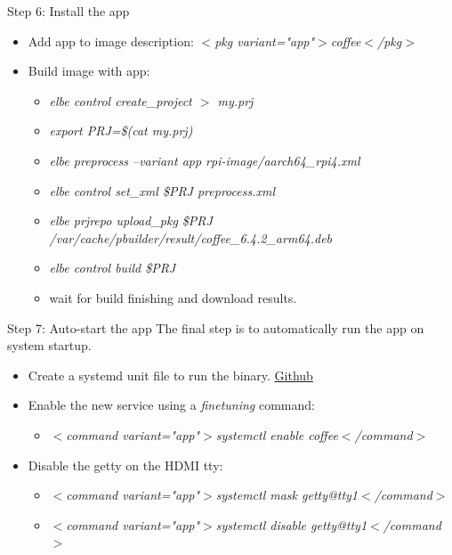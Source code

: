 \documentclass{beamer}
\begin{document}
\begin{frame}{Step 6: Install the app}
	\begin{itemize}
		\item Add app to image description: \emph{$<$pkg variant="app"$>$coffee$<$/pkg$>$}
		\item Build image with app:
		\small{\begin{itemize}
			\item \emph{elbe control create\_project $>$ my.prj}
			\item \emph{export PRJ=\$(cat my.prj)}
			\item \emph{elbe preprocess --variant app rpi-image/aarch64\_rpi4.xml}
			\item \emph{elbe control set\_xml \$PRJ preprocess.xml}
			\item \emph{elbe prjrepo upload\_pkg \$PRJ /var/cache/pbuilder/result/coffee\_6.4.2\_arm64.deb}
			\item \emph{elbe control build \$PRJ}
			\item wait for build finishing and download results.
		\end{itemize}}
	\end{itemize}
\end{frame}

\begin{frame}{Step 7: Auto-start the app}
	The final step is to automatically run the app on system startup.
	\begin{itemize}
		\item Create a systemd unit file to run the binary.
		\href{https://github.com/tomirgang/eh21_maintainable_linux/blob/main/examples/elbe_advanced/image/rpi-image/overlays/systemd/etc/systemd/system/coffee.service}{Github}
		\item Enable the new service using a \emph{finetuning} command:
		\begin{itemize}
			\item \emph{$<$command variant="app"$>$systemctl enable coffee$<$/command$>$}
		\end{itemize}
		\item Disable the getty on the HDMI tty:
		\begin{itemize}
			\item \emph{$<$command variant="app"$>$systemctl mask getty@tty1$<$/command$>$}
			\item \emph{$<$command variant="app"$>$systemctl disable getty@tty1$<$/command$>$}
		\end{itemize}
	\end{itemize}
\end{frame}
\end{document}
